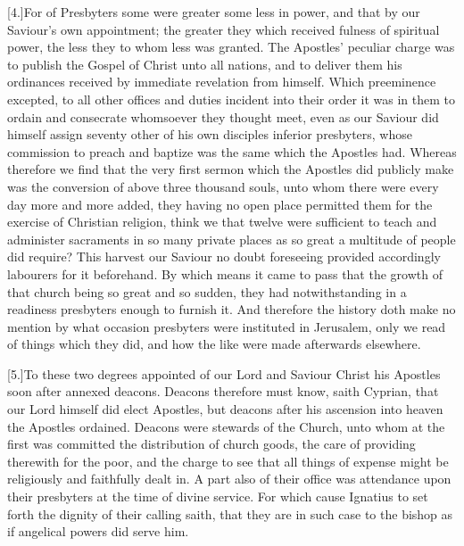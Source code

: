 [4.]For of Presbyters some were greater some less in power, and that by our Saviour’s own appointment; the greater they which received fulness of spiritual power, the less they to whom less was granted. The Apostles’ peculiar charge was to publish the Gospel of Christ unto all nations, and to deliver them his ordinances received by immediate revelation from himself. Which preeminence excepted, to all other offices and duties incident into their order it was in them to ordain and consecrate whomsoever they thought meet, even as our Saviour did himself assign seventy other of his own disciples inferior presbyters, whose commission to preach and baptize was the same which the Apostles had. Whereas therefore we find that the very first sermon which the Apostles did publicly make was the conversion of above three thousand souls, unto whom there were every day more and more added, they having no open place permitted them for the exercise of Christian religion, think we that twelve were sufficient to teach and administer sacraments in so many private places as so great a multitude of people did require? This harvest our Saviour no doubt foreseeing provided accordingly labourers for it beforehand. By which means it came to pass that the growth of that church being so great and so sudden, they had notwithstanding in a readiness presbyters enough to furnish it. And therefore the history doth make no mention by what occasion presbyters were instituted in Jerusalem, only we read of things which they did, and how the like were made afterwards elsewhere.

[5.]To these two degrees appointed of our Lord and  Saviour Christ his Apostles soon after annexed deacons.
 Deacons therefore must know, saith Cyprian, that our Lord himself did elect Apostles, but deacons after his ascension into heaven the Apostles ordained. Deacons were stewards of the Church, unto whom at the first was committed the distribution of church goods, the care of providing therewith for the poor, and the charge to see that all things of expense might be religiously and faithfully dealt in. A part also of their office was attendance upon their presbyters at the time of divine service. For which cause Ignatius to set forth the dignity of their calling saith, that they are in such case to the bishop as if angelical powers did serve him.

